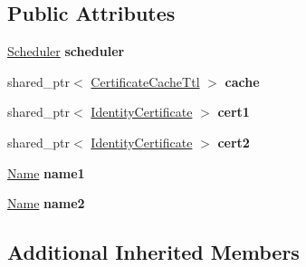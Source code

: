 \subsection*{Public Attributes}
\begin{DoxyCompactItemize}
\item 
\hyperlink{classndn_1_1util_1_1scheduler_1_1Scheduler}{Scheduler} {\bfseries scheduler}\hypertarget{classndn_1_1tests_1_1CertificateCacheFixture_a0b3f74f6f5ababbff6dabdf9c84340ce}{}\label{classndn_1_1tests_1_1CertificateCacheFixture_a0b3f74f6f5ababbff6dabdf9c84340ce}

\item 
shared\+\_\+ptr$<$ \hyperlink{classndn_1_1CertificateCacheTtl}{Certificate\+Cache\+Ttl} $>$ {\bfseries cache}\hypertarget{classndn_1_1tests_1_1CertificateCacheFixture_a1e9033c8d8b811988c8b001d9519ece0}{}\label{classndn_1_1tests_1_1CertificateCacheFixture_a1e9033c8d8b811988c8b001d9519ece0}

\item 
shared\+\_\+ptr$<$ \hyperlink{classndn_1_1IdentityCertificate}{Identity\+Certificate} $>$ {\bfseries cert1}\hypertarget{classndn_1_1tests_1_1CertificateCacheFixture_a210661b3b0d08a4e63f666b520bf68e1}{}\label{classndn_1_1tests_1_1CertificateCacheFixture_a210661b3b0d08a4e63f666b520bf68e1}

\item 
shared\+\_\+ptr$<$ \hyperlink{classndn_1_1IdentityCertificate}{Identity\+Certificate} $>$ {\bfseries cert2}\hypertarget{classndn_1_1tests_1_1CertificateCacheFixture_a9a5efcd5498aabafa7a2c29994ac915e}{}\label{classndn_1_1tests_1_1CertificateCacheFixture_a9a5efcd5498aabafa7a2c29994ac915e}

\item 
\hyperlink{classndn_1_1Name}{Name} {\bfseries name1}\hypertarget{classndn_1_1tests_1_1CertificateCacheFixture_aa9e5e72158d3b4a9af3b610d56551333}{}\label{classndn_1_1tests_1_1CertificateCacheFixture_aa9e5e72158d3b4a9af3b610d56551333}

\item 
\hyperlink{classndn_1_1Name}{Name} {\bfseries name2}\hypertarget{classndn_1_1tests_1_1CertificateCacheFixture_a3a0e69da8b36a0047925055db6e2d4a1}{}\label{classndn_1_1tests_1_1CertificateCacheFixture_a3a0e69da8b36a0047925055db6e2d4a1}

\end{DoxyCompactItemize}
\subsection*{Additional Inherited Members}


